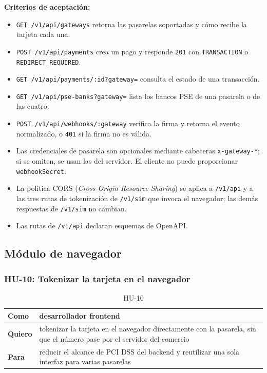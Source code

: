 \textbf{Criterios de aceptación:}
\begin{itemize}
  \item \texttt{GET /v1/api/gateways} retorna las pasarelas soportadas y cómo recibe la tarjeta cada una.
  \item \texttt{POST /v1/api/payments} crea un pago y responde \texttt{201} con \texttt{TRANSACTION} o \texttt{REDIRECT\_REQUIRED}.
  \item \texttt{GET /v1/api/payments/:id?gateway=} consulta el estado de una transacción.
  \item \texttt{GET /v1/api/pse-banks?gateway=} lista los bancos PSE de una pasarela o de las cuatro.
  \item \texttt{POST /v1/api/webhooks/:gateway} verifica la firma y retorna el evento normalizado, o \texttt{401} si la firma no es válida.
  \item Las credenciales de pasarela son opcionales mediante cabeceras \texttt{x-gateway-*}; si se omiten, se usan las del servidor. El cliente no puede proporcionar \texttt{webhookSecret}.
  \item La política CORS (\textit{Cross-Origin Resource Sharing}) se aplica a \texttt{/v1/api} y a las tres rutas de tokenización de \texttt{/v1/sim} que invoca el navegador; las demás respuestas de \texttt{/v1/sim} no cambian.
  \item Las rutas de \texttt{/v1/api} declaran esquemas de OpenAPI.
\end{itemize}

\subsection{Módulo de navegador}

\subsubsection{HU-10: Tokenizar la tarjeta en el navegador}
\begin{table}[H]
  \centering
  \renewcommand{\arraystretch}{1.2}
  \begin{tabularx}{\textwidth}{|l|X|}
    \hline
    \textbf{Como} & desarrollador frontend \\
    \hline
    \textbf{Quiero} & tokenizar la tarjeta en el navegador directamente con la pasarela, sin que el número pase por el servidor del comercio \\
    \hline
    \textbf{Para} & reducir el alcance de PCI DSS del backend y reutilizar una sola interfaz para varias pasarelas \\
    \hline
  \end{tabularx}
  \caption{HU-10}
  \label{tab:hu-10}
\end{table}

